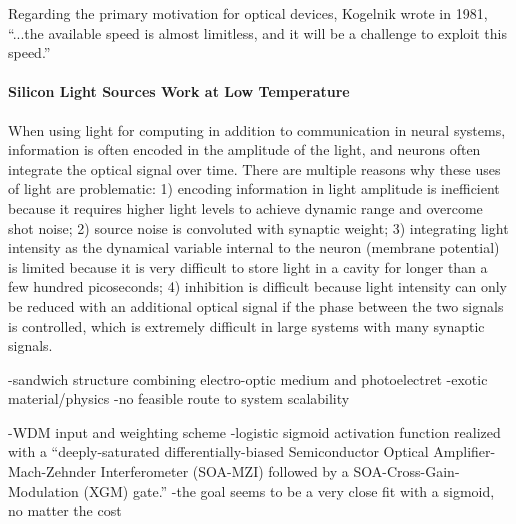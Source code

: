 \vspace{3em}
Regarding the primary motivation for optical devices, Kogelnik wrote in 1981, ``...the available speed is almost limitless, and it will be a challenge to exploit this speed.'' \cite{ko1981}

\paragraph{Silicon Light Sources Work at Low Temperature}

\vspace{3em}
When using light for computing in addition to communication in neural systems, information is often encoded in the amplitude of the light, and neurons often integrate the optical signal over time. There are multiple reasons why these uses of light are problematic: 1) encoding information in light amplitude is inefficient because it requires higher light levels to achieve dynamic range and overcome shot noise; 2) source noise is convoluted with synaptic weight; 3) integrating light intensity as the dynamical variable internal to the neuron (membrane potential) is limited because it is very difficult to store light in a cavity for longer than a few hundred picoseconds; 4) inhibition is difficult because light intensity can only be reduced with an additional optical signal if the phase between the two signals is controlled, which is extremely difficult in large systems with many synaptic signals.

\vspace{3em}

\cite{fepe2019}

\cite{pena2018} 

\cite{chsa2018}

\cite{fesh2017}

\cite{wuso2014}

\cite{mebo2015}

\cite{lipe2019}

\cite{tafe2018}

\cite{rokr2009}


\cite{mo2000}
-sandwich structure combining electro-optic medium and photoelectret
-exotic material/physics
-no feasible route to system scalability

\cite{mots2019}
-WDM input and weighting scheme
-logistic sigmoid activation function realized with a ``deeply-saturated differentially-biased Semiconductor Optical Amplifier-Mach-Zehnder Interferometer (SOA-MZI) followed by a SOA-Cross-Gain-Modulation (XGM) gate.''
-the goal seems to be a very close fit with a sigmoid, no matter the cost
